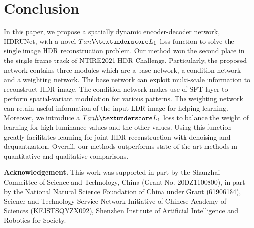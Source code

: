 \documentclass[final]{cvpr}
\begin{document}
\begin{table}[htbp]
	\begin{center}
\setlength{}
	\end{center}
	\caption{Results of the top5 methods in the challenge.}
	\vspace{-10pt}
	\label{tab:competition results}
\end{table}

\section{Conclusion}
In this paper, we propose a spatially dynamic encoder-decoder network, HDRUNet, with a novel $Tanh \textunderscore L_1$ loss function to solve the single image HDR reconstruction problem. Our method won the second place in the single frame track of NTIRE2021 HDR Challenge. Particularly, the proposed network contains three modules which are a base network, a condition network and a weighting network. The base network can exploit multi-scale information to reconstruct HDR image. The condition network makes use of SFT layer to perform spatial-variant modulation for various patterns. The weighting network can retain useful information of the input LDR image for helping learning. Moreover, we introduce a $Tanh \textunderscore L_1$ loss to balance the weight of learning for high luminance values and the other values. Using this function greatly facilitates learning for joint HDR reconstruction with denoising and dequantization. Overall, our methods outperforms state-of-the-art methods in quantitative and qualitative comparisons.

\textbf{Acknowledgement.} This work was supported in part by the Shanghai Committee of Science and Technology, China (Grant No. 20DZ1100800), in part by the National Natural Science Foundation of China under Grant (61906184), Science and Technology Service Network Initiative of Chinese Academy of Sciences (KFJSTSQYZX092), Shenzhen Institute of Artificial Intelligence and Robotics for Society.

\clearpage
{\small


}
\end{document}
